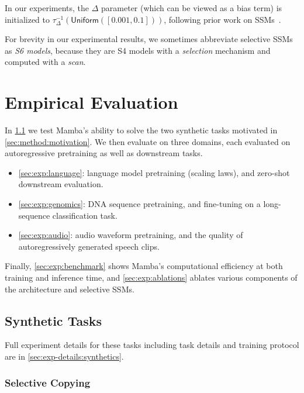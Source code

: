 In our experiments, the $\Delta$ parameter (which can be viewed as a bias term) is initialized to $\tau_\Delta^{-1}(\mathsf{Uniform}([0.001, 0.1]))$, following prior work on SSMs~\citep{gu2023train}.

\begin{remark}
  For brevity in our experimental results, we sometimes abbreviate selective SSMs as \emph{S6 models}, because they are S4 models with a \emph{selection} mechanism and computed with a \emph{scan}.
\end{remark}

\section{Empirical Evaluation}
\label{sec:exps}

In \ref{sec:exp:synthetic} we test Mamba's ability to solve the two synthetic tasks motivated in \ref{sec:method:motivation}.
We then evaluate on three domains, each evaluated on autoregressive pretraining as well as downstream tasks.

\begin{itemize}[leftmargin=*,itemsep=0pt,topsep=0pt]
  \item \ref{sec:exp:language}: language model pretraining (scaling laws), and zero-shot downstream evaluation.
  \item \ref{sec:exp:genomics}: DNA sequence pretraining, and fine-tuning on a long-sequence classification task.
  \item \ref{sec:exp:audio}: audio waveform pretraining, and the quality of autoregressively generated speech clips.
\end{itemize}

Finally, \ref{sec:exp:benchmark} shows Mamba's computational efficiency at both training and inference time, and \ref{sec:exp:ablations} ablates various components of the architecture and selective SSMs.

\subsection{Synthetic Tasks}
\label{sec:exp:synthetic}

Full experiment details for these tasks including task details and training protocol are in \ref{sec:exp-details:synthetics}.

\subsubsection{Selective Copying}

